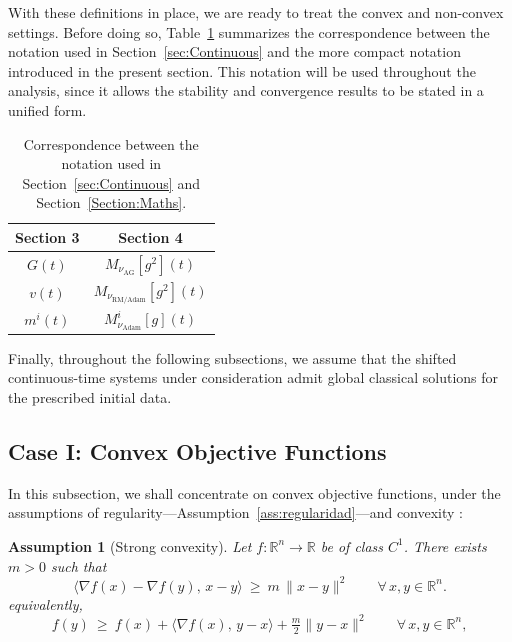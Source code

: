 \documentclass{article} %
\newtheorem{assumption}{Assumption}
\begin{document}

With these definitions in place, we are ready to treat the convex and non-convex settings. Before doing so, Table~\ref{tab:placeholder} summarizes the correspondence between the notation used in Section~\ref{sec:Continuous} and the more compact notation introduced in the present section. This notation will be used throughout the analysis, since it allows the stability and convergence results to be stated in a unified form.

\begin{table}[htbp]
    \centering
    \setlength{\tabcolsep}{12pt} %
    \renewcommand{\arraystretch}{1.2} %
    \begin{tabular}{@{}cc@{}}
      \toprule
      \textbf{Section 3} & \textbf{Section 4} \\
      \midrule
      $G(t)$      & $M_{\nu_{\text{AG}}}[g^2](t)$ \\
      $v(t)$      & $M_{\nu_{\text{RM/Adam}}}[g^2](t)$ \\
      $m^{i}(t)$  & $M^{i}_{\nu_{\text{Adam}}}[g](t)$ \\
      \bottomrule
    \end{tabular}
    \caption{Correspondence between the notation used in Section~\ref{sec:Continuous} and Section~\ref{Section:Maths}.}
    \label{tab:placeholder}
  \end{table}

Finally, throughout the following subsections, we assume that the shifted continuous-time systems under consideration admit global classical solutions for the prescribed initial data.

\subsection{Case I: Convex Objective Functions}\label{Section:Convex_math}

In this subsection, we shall concentrate on convex objective functions, under the assumptions of regularity---Assumption~\ref{ass:regularidad}---and convexity \cite{BauschkeCombettes2017}:

\begin{assumption}[Strong convexity]\label{ass:convexidad}
Let \(f:\mathbb{R}^n\to\mathbb{R}\) be of class \(C^1\). There exists \(m>0\) such that
\[
\langle \nabla f(x)-\nabla f(y),\,x-y\rangle\ \ge\ m\,\|x-y\|^2\qquad \forall\,x,y\in\mathbb{R}^n.
\]
equivalently,
\[
f(y)\ \ge\ f(x)+\langle \nabla f(x),\,y-x\rangle+\tfrac{m}{2}\|y-x\|^2\qquad \forall\,x,y\in\mathbb{R}^n,
\]
\end{assumption}
\end{document}

